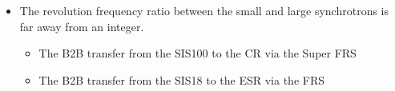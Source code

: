 \begin{itemize}

 	\item The revolution frequency ratio between the small and large synchrotrons is far away from an integer.
		\begin{itemize}
			\item The B2B transfer from the SIS100 to the CR via the Super FRS
			\item The B2B transfer from the SIS18 to the ESR via the FRS
		\end{itemize}
\end{itemize}
  

